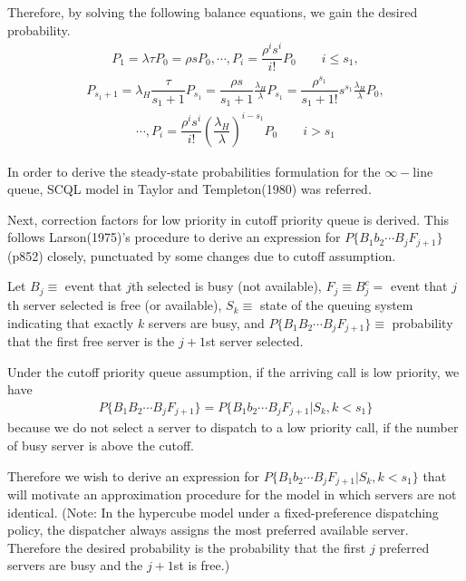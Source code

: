 \documentclass{article}
\begin{document}
Therefore, by solving the following balance equations, we gain the desired probability.
\begin{align*} P_1= \lambda \tau P_0 =\rho s P_0, \cdots, P_i = \dfrac{\rho^i s^i}{i!} P_0 \quad \quad i\leq s_1,
\end{align*}
\begin{align*}
P_{s_1+1} = \lambda_H \dfrac{\tau}{ s_1+1} P_{s_1}=\dfrac{\rho s}{s_1+1} \frac{\lambda_H}{\lambda} P_{s_1}=\dfrac{\rho^{s_1}}{s_1+1!} s^{s_1} \frac{\lambda_H}{\lambda} P_{0},
\end{align*}
\begin{align*}
\cdots, P_i = \dfrac{\rho^i s^i}{i!} (\dfrac{\lambda_H}{\lambda})^{i-s_1} P_0 \quad \quad i > s_1
\end{align*}

In order to derive the steady-state probabilities formulation for the $\infty-$line queue, SCQL model in Taylor and Templeton(1980) was referred.

Next, correction factors for low priority in cutoff priority queue is derived. This follows Larson(1975)'s procedure to derive an expression for $P \{ B_1b_2 \cdots B_jF_{j+1}\}$ (p852) closely, punctuated by some changes due to cutoff assumption.

Let $B_j \equiv $ event that $j$th selected is busy (not available), $F_j \equiv B_j^c =$ event that $j$th server selected is free (or available), $S_k \equiv $  state of the queuing system indicating that exactly $k$ servers are busy, and $P \{ B_1B_2 \cdots B_j F_{j+1}\} \equiv $ probability that the first free server is the $j+1$st server selected.

Under the cutoff priority queue assumption, if the arriving call is low priority, we have
\begin{align*}P \{ B_1B_2 \cdots B_j F_{j+1}\}=P \{ B_1b_2 \cdots B_jF_{j+1}|S_k,k<s_1\}
\end{align*}
because we do not select a server to dispatch to a low priority call, if the number of busy server is above the cutoff.

Therefore we wish to derive an expression for $P \{ B_1b_2 \cdots B_jF_{j+1}|S_k,k<s_1\}$ that will motivate an approximation procedure for the model in which servers are not identical. (Note: In the hypercube model under a fixed-preference dispatching policy, the dispatcher always assigns the most preferred available server. Therefore the desired probability is the probability that the first $j$ preferred servers are busy and the $j+1$st is free.)
\end{document}
